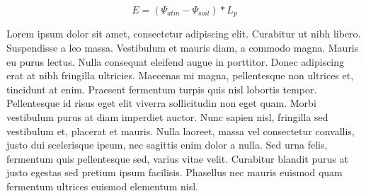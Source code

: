 \begin{equation}
E=(\Psi_{atm}- \Psi_{soil} )*L_{p}  
\label{eq:water:flow}
\end{equation}

Lorem ipsum dolor sit amet, consectetur adipiscing elit. Curabitur ut nibh libero. Suspendisse a leo massa. Vestibulum et mauris diam, a commodo magna. Mauris eu purus lectus. Nulla consequat eleifend augue in porttitor. Donec adipiscing erat at nibh fringilla ultricies. Maecenas mi magna, pellentesque non ultrices et, tincidunt at enim. Praesent fermentum turpis quis nisl lobortis tempor. Pellentesque id risus eget elit viverra sollicitudin non eget quam. Morbi vestibulum purus at diam imperdiet auctor. Nunc sapien nisl, fringilla sed vestibulum et, placerat et mauris. Nulla laoreet, massa vel consectetur convallis, justo dui scelerisque ipsum, nec sagittis enim dolor a nulla. Sed urna felis, fermentum quis pellentesque sed, varius vitae velit. Curabitur blandit purus at justo egestas sed pretium ipsum facilisis. Phasellus nec mauris euismod quam fermentum ultrices euismod elementum nisl.
